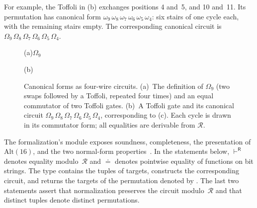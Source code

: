 \documentclass[acmsmall,screen,nonacm]{acmart}
\begin{document}
For example, the Toffoli in (b) exchanges
positions 4 and~5, and 10 and~11. Its permutation has canonical
form $\omega_9\,\omega_8\,\omega_7\,\omega_6\,\omega_5\,\omega_4$:
six stairs of one cycle each, with the remaining stairs empty.
The corresponding canonical circuit is
$\Omega_9\,\Omega_8\,\Omega_7\,\Omega_6\,\Omega_5\,\Omega_4$.

\begin{figure}[!htbp]
\centering
\small
\textup{(a)}\quad$\Omega_9$\xeq\xeq
\par\vspace{1.5em}
\textup{(b)}\quad\xeq
\caption{Canonical forms as four-wire circuits.
(a)~The definition of $\Omega_9$ (two swaps followed by a Toffoli,
repeated four times) and an equal commutator of two Toffoli gates.
(b)~A Toffoli gate and its canonical circuit
$\Omega_9\,\Omega_8\,\Omega_7\,\Omega_6\,\Omega_5\,\Omega_4$,
corresponding to (c).
Each cycle is drawn in its commutator form; all equalities are
derivable from $\mathcal{R}$.}
\label{fig:xcxccx-canon}
\end{figure}

The formalization's  module exposes soundness,
completeness, the presentation of $\mathrm{Alt}(16)$, and the two
normal-form properties~\cite{equacert2026artifact}.
In the statements below, $\vdash^{\mathsf{R}}$ denotes equality
modulo~$\mathcal{R}$ and $\doteq$ denotes pointwise equality of
functions on bit strings. The type  contains the tuples of
targets,  constructs the corresponding circuit, and
 returns the targets of the permutation denoted by .
The last two statements assert that normalization preserves the
circuit modulo~$\mathcal{R}$ and that distinct tuples denote
distinct permutations.
\end{document}
